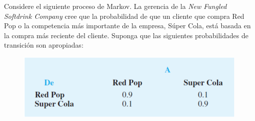 





\begin{problema}
	Considere el siguiente proceso de Markov. La gerencia de la \textit{New Fungled Softdrink Company} cree que la probabilidad de que
	un cliente que compra Red Pop o la competencia más importante de la empresa, Súper Cola, está basada en la compra más
	reciente del cliente. Suponga que las siguientes probabilidades de transición son apropiadas:
	\begin{figure}[H]
		\centering
		\includegraphics[scale=0.3]{Images/1}
	\end{figure}


\end{problema}

